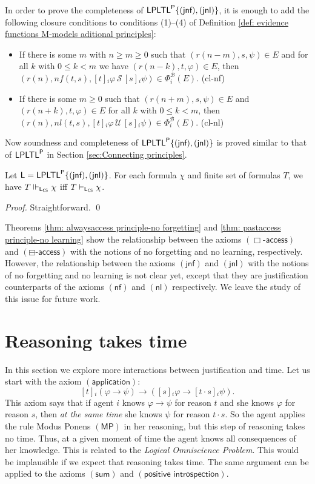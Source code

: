 \documentclass[envcountsect,envcountsame,oribibl,orivec]{llncs}
\newcommand{\mprule}{\ensuremath{(\textsf{MP})}}
\newcommand{\limplies}{\rightarrow}
\newcommand{\lalways}{\Box}
\newcommand{\lsofar}{\boxminus}
\newcommand{\luntil}{{\,\mathcal{U}\,}}
\newcommand{\lsince}{{\,\mathcal{S}\,}}
\newcommand{\LPLTLp}{\textsf{LPLTL}^{\sf P}}
\newcommand{\nlax}{\ensuremath{(\textsf{nl})}}
\newcommand{\jnlax}{\ensuremath{(\textsf{jnl})}}
\newcommand{\jnfax}{\ensuremath{(\textsf{jnf})}}
\newcommand{\nfax}{\ensuremath{(\textsf{nf})}}
\newcommand{\jbox}[1]{\left[#1\right]\!}
\newcommand{\tapp}{\cdot}
\newcommand{\appax}{\ensuremath{(\textsf{application})}}
\newcommand{\sumax}{\ensuremath{(\textsf{sum})}}
\newcommand{\posintax}{\ensuremath{(\textsf{positive introspection})}}
\newcommand{\CS}{\textsf{CS}}
\newcommand{\agent}{i}
\newcommand{\alwaysaccessprinciple}{\ensuremath{(\lalways\textsf{-access})}}
\newcommand{\pastaccessprinciple}{\ensuremath{(\lsofar\textsf{-access})}}
\renewcommand{\phi}{\varphi}
\newcommand{\B}{\mathcal{B}}
\newcommand{\Op}[1]{\Phi^{#1}}
\newcommand{\OpB}{\Op{\B}_i}
\begin{document}
%
In order to prove the completeness of $\LPLTLp \{ \jnfax, \jnlax \}$, it is enough to add the following closure conditions to  conditions (1)--(4) of Definition  \ref{def: evidence functions M-models aditional principles}:
%
\begin{itemize}
	\item If there is some $m$ with $n \geq m \geq 0$ such that  $(r(n-m),s,\psi) \in E$ and for all $k$ with $0 \leq k < m$ we have $(r(n-k),t,\phi) \in E$, then $(r(n), nf(t,s),\jbox{t}_\agent \phi \lsince \jbox{s}_\agent \psi) \in \OpB(E)$. \hfill (cl-nf)
	
	\item If there is some  $m \geq 0$ such that  $(r(n+m),s,\psi) \in E$  and $(r(n+k),t,\phi) \in E$ for all $k$ with $0 \leq k < m$, then $(r(n),nl(t,s),\jbox{t}_\agent \phi \luntil \jbox{s}_\agent \psi) \in \OpB(E)$. \hfill (cl-nl)
\end{itemize}
%
Now soundness and completeness of $\LPLTLp \{ \jnfax, \jnlax \}$ is proved similar to that of $\LPLTLp$ in Section \ref{sec:Connecting principles}.

\begin{theorem}
	Let ${\sf L} = \LPLTLp \{ \jnfax, \jnlax \}$. For each formula $\chi$ and finite set of formulas $T$, we have $T \Vdash_{{\sf L}_\CS}  \chi$ if{f} $T \vdash_{{\sf L}_\CS} \chi$.
\end{theorem}
\begin{proof}
	Straightforward.  \qed
\end{proof}

Theorems \ref{thm: alwaysaccess principle-no forgetting} and \ref{thm: pastaccess principle-no learning} show the relationship between the axioms $\alwaysaccessprinciple$ and $\pastaccessprinciple$ with the notions of no forgetting and no learning, respectively. However, the relationship between the axioms $\jnfax$ and $\jnlax$ with the notions of no forgetting and no learning is not clear yet, except that they are justification counterparts of the axioms $\nfax$ and $\nlax$ respectively. We leave the study of this issue for future work.


\section{Reasoning takes time}
\label{sec:JLTL}

In this section we explore more interactions between justification and time. Let us start with the axiom  $\appax$:
%
\[
\jbox{t}_\agent (\phi \limplies \psi) \limplies (\jbox{s}_\agent \phi \limplies \jbox{t \tapp s}_\agent \psi).
\]
%
This axiom says that if  agent $i$ knows $\phi \limplies \psi$ for reason $t$ and she knows $\phi$ for reason $s$, then  \textit{at the same time} she knows $\psi$ for reason $t \tapp s$. So the agent applies the rule Modus Ponens $\mprule$ in her reasoning, but this step of reasoning takes no time. Thus, at a given moment of time the agent knows all consequences of her knowledge. This is related to the \textit{Logical Omniscience Problem}. This would be implausible if we expect that reasoning takes time. The same argument can be applied to the axioms $\sumax$ and $\posintax$. 
\end{document}
